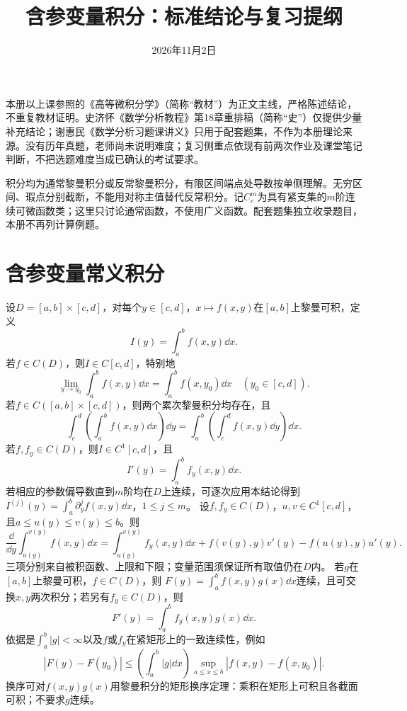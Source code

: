 
\title{含参变量积分：标准结论与复习提纲}
\author{}\date{2026年11月2日}
\maketitle
\scope

本册以上课参照的《高等微积分学》（简称“教材”）为正文主线，严格陈述结论，不重复教材证明。史济怀《数学分析教程》第18章重排稿（简称“史”）仅提供少量补充结论；谢惠民《数学分析习题课讲义》只用于配套题集，不作为本册理论来源。没有历年真题，老师尚未说明难度；复习侧重点依现有前两次作业及课堂笔记判断，不把选题难度当成已确认的考试要求。

积分均为通常黎曼积分或反常黎曼积分，有限区间端点处导数按单侧理解。无穷区间、瑕点分别截断，不能用对称主值替代反常积分。记$C_c^m$为具有紧支集的$m$阶连续可微函数类；这里只讨论通常函数，不使用广义函数。配套题集独立收录题目，本册不再列计算例题。
\tableofcontents\clearpage
\section{含参变量常义积分}
设$D=[a,b]\times[c,d]$，对每个$y\in[c,d]$，$x\mapsto f(x,y)$在$[a,b]$上黎曼可积，定义
\[
 I(y)=\int_a^b f(x,y)\dd x.
\]
若$f\in C(D)$，则$I\in C[c,d]$，特别地
\[
 \lim_{y\to y_0}\int_a^bf(x,y)\dd x
 =\int_a^b f(x,y_0)\dd x\quad(y_0\in[c,d]).
\]
若$f\in C([a,b]\times[c,d])$，则两个累次黎曼积分均存在，且
\[
 \int_c^d\left(\int_a^bf(x,y)\dd x\right)\dd y
 =\int_a^b\left(\int_c^df(x,y)\dd y\right)\dd x.
\]
若$f,f_y\in C(D)$，则$I\in C^1[c,d]$，且
\[
 I'(y)=\int_a^bf_y(x,y)\dd x.
\]
若相应的参数偏导数直到$m$阶均在$D$上连续，可逐次应用本结论得到
$I^{(j)}(y)=\int_a^b\partial_y^jf(x,y)\dd x$，$1\le j\le m$。
设$f,f_y\in C(D)$，$u,v\in C^1[c,d]$，且$a\le u(y)\le v(y)\le b$。则
\[
 \frac{\dd}{\dd y}\int_{u(y)}^{v(y)}f(x,y)\dd x
 =\int_{u(y)}^{v(y)}f_y(x,y)\dd x
 +f(v(y),y)v'(y)-f(u(y),y)u'(y).
\]
三项分别来自被积函数、上限和下限；变量范围须保证所有取值仍在$D$内。
若$g$在$[a,b]$上黎曼可积，$f\in C(D)$，则
$F(y)=\int_a^bf(x,y)g(x)\dd x$连续，且可交换$x,y$两次积分；若另有$f_y\in C(D)$，则
\[
 F'(y)=\int_a^bf_y(x,y)g(x)\dd x.
\]
依据是$\int_a^b|g|<\infty$以及$f$或$f_y$在紧矩形上的一致连续性，例如
\[
 |F(y)-F(y_0)|\le\left(\int_a^b|g|\dd x\right)
 \sup_{a\le x\le b}|f(x,y)-f(x,y_0)|.
\]
换序可对$f(x,y)g(x)$用黎曼积分的矩形换序定理：乘积在矩形上可积且各截面可积；不要求$g$连续。
